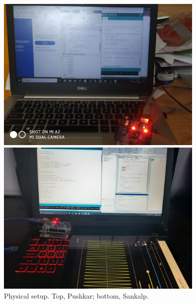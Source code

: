 \begin{figure}[pt]
    \centering
    \includegraphics[width=0.9\textwidth]{fig/pushkreal.png}
    
    \includegraphics[width=0.9\textwidth]{fig/sankareal.png}
    \caption{Physical setup. Top, Pushkar; bottom, Sankalp.}
    \label{fig:realsetup}
\end{figure}
